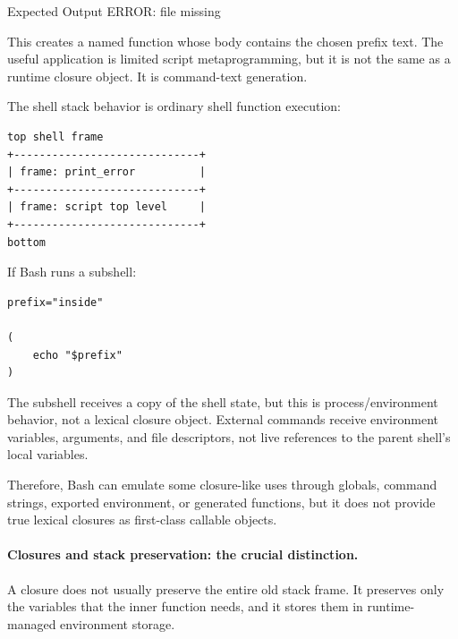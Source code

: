 

\begin{iobox}{Expected Output}
ERROR: file missing \\
\end{iobox}



This creates a named function whose body contains the chosen prefix text. The useful application is limited script metaprogramming, but it is not the same as a runtime closure object. It is command-text generation.

The shell stack behavior is ordinary shell function execution:

\begin{verbatim}
top shell frame
+-----------------------------+
| frame: print_error          |
+-----------------------------+
| frame: script top level     |
+-----------------------------+
bottom
\end{verbatim}

If Bash runs a subshell:

\begin{verbatim}
prefix="inside"

(
    echo "$prefix"
)
\end{verbatim}

The subshell receives a copy of the shell state, but this is process/environment behavior, not a lexical closure object. External commands receive environment variables, arguments, and file descriptors, not live references to the parent shell's local variables.

Therefore, Bash can emulate some closure-like uses through globals, command strings, exported environment, or generated functions, but it does not provide true lexical closures as first-class callable objects.

\paragraph{Closures and stack preservation: the crucial distinction.}

A closure does not usually preserve the entire old stack frame. It preserves only the variables that the inner function needs, and it stores them in runtime-managed environment storage.

